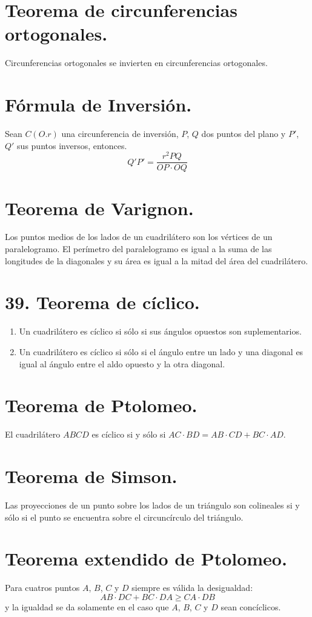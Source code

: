 \documentclass[12pt,a4paper,oneside]{book}
\begin{document}
\section{Teorema de circunferencias  ortogonales.}
Circunferencias ortogonales se invierten en circunferencias ortogonales.
\section{Fórmula de Inversión.}
Sean $C(O. r)$ una circunferencia de inversión, $P$, $Q$ dos puntos del plano y $P'$, $Q'$ sus puntos inversos, entonces.$$Q'P'= \dfrac{r^2PQ}{OP \cdot OQ}$$
\section{Teorema de Varignon.}
Los puntos medios de los lados de un cuadrilátero son los vértices de un paralelogramo. El perímetro del paralelogramo es igual a la suma de las longitudes de la diagonales y su área es igual a la mitad del área del cuadrilátero. 
\section{39. Teorema de cíclico.}
\begin{enumerate}
\item Un cuadrilátero es cíclico si sólo si sus ángulos opuestos son suplementarios.
\item Un cuadrilátero es cíclico si sólo si el ángulo entre un lado y una diagonal es igual al ángulo entre el aldo opuesto y la otra diagonal.
\end{enumerate}
\section{Teorema de Ptolomeo.}
El cuadrilátero $ABCD$ es cíclico si y sólo si $AC \cdot BD = AB \cdot CD + BC \cdot AD$.
\section{Teorema de Simson.}
Las proyecciones de un punto sobre los lados de un triángulo son colineales si y sólo si el punto se encuentra sobre el circuncírculo del triángulo.
\section{Teorema extendido de Ptolomeo.}
Para cuatros puntos $A$, $B$, $C$ y $D$ siempre es válida la desigualdad:$$AB \cdot DC + BC\cdot DA \geq CA \cdot DB$$ 
y la igualdad se da solamente en el caso que $A$, $B$, $C$ y $D$ sean concíclicos.
\end{document}
